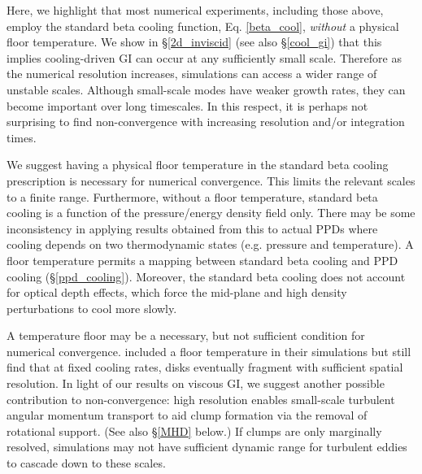 Here, we highlight that most numerical experiments, including those
above, employ the standard beta cooling function, Eq. \ref{beta_cool},
\emph{without} a physical floor temperature. We show in \S\ref{2d_inviscid}
(see also \S\ref{cool_gi}) that this implies cooling-driven GI can
occur at any sufficiently small scale. Therefore as the numerical
resolution increases, simulations can access a wider range of unstable
scales. Although small-scale modes have weaker growth rates, they can 
become important over long timescales.  
In this respect, it is perhaps not surprising to find non-convergence with 
increasing resolution and/or integration times. 

We suggest having a physical floor temperature in the standard beta
cooling prescription is  necessary for  
numerical convergence. This limits the
relevant scales to a finite range.  %
Furthermore, without a floor temperature, standard beta cooling is
a function of the pressure/energy density field only. 
There may be some inconsistency in applying results obtained from 
this to actual PPDs where cooling depends on two thermodynamic states (e.g. pressure and
temperature). A floor temperature permits a mapping between standard beta
cooling and PPD cooling (\S\ref{ppd_cooling}). 
Moreover, the standard beta cooling does 
not account for optical depth effects, which force the mid-plane 
and high density perturbations to cool more slowly.

%


A temperature floor may be a necessary, but not sufficient condition
for numerical convergence. \cite{baehr15} included a floor temperature 
in their simulations but still find that at fixed cooling rates, disks
eventually fragment with sufficient spatial resolution.
In light of our results on viscous GI, 
we suggest another possible contribution to non-convergence: %
high resolution enables small-scale turbulent angular momentum transport 
to aid clump formation via the removal of rotational support. (See also \S\ref{MHD} below.) 
If clumps are only marginally resolved, simulations may not have sufficient dynamic range for turbulent eddies
to cascade down to these scales.

